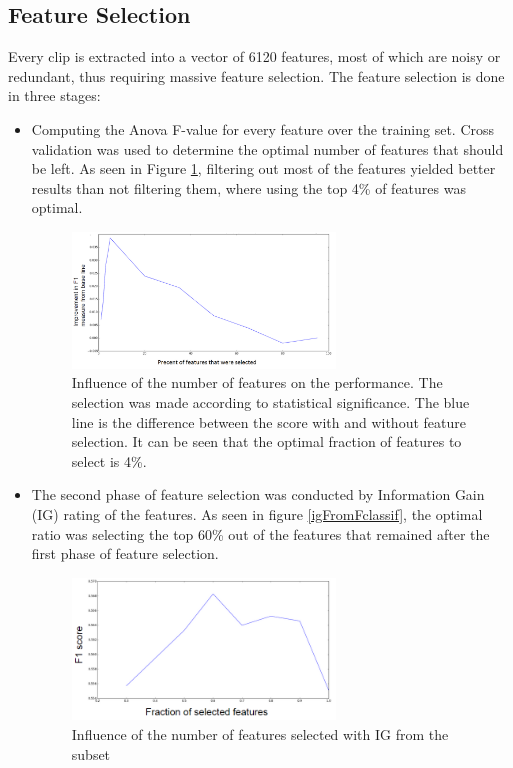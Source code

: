 \documentclass[11pt,twocolumn,varwidth=true,a4paper,fleqn]{article}
\begin{document}
\subsection{Feature Selection}
Every clip is extracted into a vector of 6120 features, most of which are noisy or redundant, thus requiring massive feature selection. The feature selection is done in three stages:
	\begin{itemize}
		\item
		Computing the Anova F-value for every feature over the training set. Cross 
		validation was used to determine the optimal number of features that should be
		left. As seen in Figure  \ref{selection}, filtering out most of the features yielded better          results than not filtering them, where using the top 4\% of features was optimal.
		\begin{figure}[ht!]
			\centering
			\includegraphics[width=70mm]{featureSelection.png}
			\caption{Influence of the number of features on the performance. The
			selection was made according to statistical significance.
			The blue line is the difference between the score with and without feature
			selection. It can be seen that the optimal fraction of features to select is
			4\%.}
			\label{selection}
			\end{figure}
		\item
			The second phase of feature selection was conducted by Information Gain (IG)
			rating of the features. As seen in figure  \ref{igFromFclassif}, the optimal ratio
			was selecting the top 60\% out of the features that remained after the first
			phase of feature selection.
			 \begin{figure}[h]
				\centering
				\includegraphics[width=70mm]{igFromFclassif.png}
				\caption{Influence of the number of features selected with IG from the subset
}
\end{figure}
\end{itemize}
\end{document}
